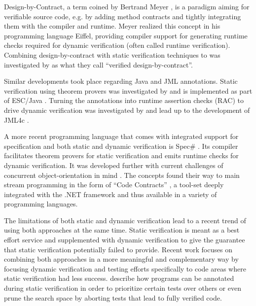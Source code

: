 Design-by-Contract, a term coined by Bertrand Meyer \cite{meyer2002design}, is a paradigm aiming for verifiable source code, e.g. by adding method contracts and tightly integrating them with the compiler and runtime.
Meyer realized this concept in his programming language Eiffel, providing compiler support for generating runtime checks required for dynamic verification (often called runtime verification).
Combining design-by-contract with static verification techniques to was investigated by \cite{crocker2004safe} as what they call “verified design-by-contract”.

Similar developments took place regarding Java and JML annotations.
Static verification using theorem provers was investigated by \cite{jacobs2001logic} and is implemented as part of ESC/Java \cite{nelson2004extended}.
Turning the annotations into runtime assertion checks (RAC) to drive dynamic verification was investigated by \cite{cheon2002runtime} and lead up to the development of JML4c \cite{sarcar2010new}.

A more recent programming language that comes with integrated support for specification and both static and dynamic verification is Spec\# \cite{the-spec-programming-system-an-overview}.
Its compiler facilitates theorem provers for static verification and emits runtime checks for dynamic verification.
It was developed further with current challenges of concurrent object-orientation in mind \cite{a-statically-verifiable-programming-model-for-concurrent-object-oriented-programs}.
The concepts found their way to main stream programming in the form of “Code Contracts” \cite{embedded-contract-languages}, a tool-set deeply integrated with the .NET framework and thus available in a variety of programming languages.

The limitations of both static and dynamic verification lead to a recent trend of using both approaches at the same time.
Static verification is meant as a best effort service and supplemented with dynamic verification to give the guarantee that static verification potentially failed to provide.
Recent work focuses on combining both approaches in a more meaningful and complementary way by focusing dynamic verification and testing efforts specifically to code areas where static verification had less success.
\cite{ChristakisMuellerWuestholz16} describe how programs can be annotated during static verification in order to prioritize certain tests over others or even prune the search space by aborting tests that lead to fully verified code.

